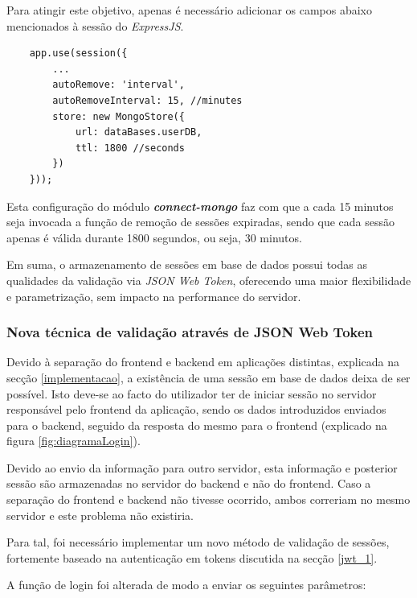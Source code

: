 Para atingir este objetivo, apenas é necessário adicionar os campos abaixo mencionados à sessão do \emph{ExpressJS}.

\begin{verbatim}
    app.use(session({
        ...
        autoRemove: 'interval',
        autoRemoveInterval: 15, //minutes
        store: new MongoStore({
            url: dataBases.userDB,
            ttl: 1800 //seconds
        })
    }));
\end{verbatim}

Esta configuração do módulo \emph{\textbf{connect-mongo}} faz com que a cada 15 minutos seja invocada a função de remoção de sessões expiradas, sendo que cada sessão apenas é válida durante 1800 segundos, ou seja, 30 minutos.

Em suma, o armazenamento de sessões em base de dados possui todas as qualidades da validação via \emph{JSON Web Token}, oferecendo uma maior flexibilidade e parametrização, sem impacto na performance do servidor.

\cleardoublepage
\subsubsection{Nova técnica de validação através de JSON Web Token} \label{jwt_2}

Devido à separação do frontend e backend em aplicações distintas, explicada na secção \ref{implementacao}, a existência de uma sessão em base de dados deixa de ser possível. Isto deve-se ao facto do utilizador ter de iniciar sessão no servidor responsável pelo frontend da aplicação, sendo os dados introduzidos enviados para o backend, seguido da resposta do mesmo para o frontend (explicado na figura \ref{fig:diagramaLogin}).

Devido ao envio da informação para outro servidor, esta informação e posterior sessão são armazenadas no servidor do backend e não do frontend. Caso a separação do frontend e backend não tivesse ocorrido, ambos correriam no mesmo servidor e este problema não existiria.

Para tal, foi necessário implementar um novo método de validação de sessões, fortemente baseado na autenticação em tokens discutida na secção \ref{jwt_1}.

A função de login foi alterada de modo a enviar os seguintes parâmetros:

